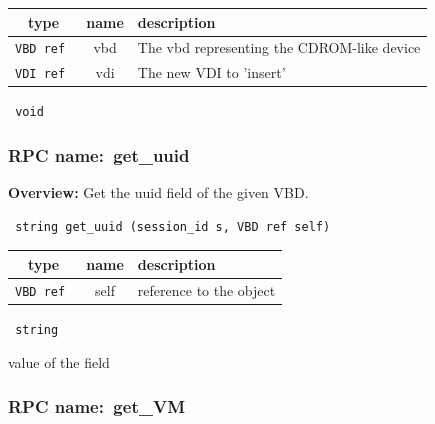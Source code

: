 
 
\vspace{0.3cm}
\begin{tabular}{|c|c|p{7cm}|}
 \hline
{\bf type} & {\bf name} & {\bf description} \\ \hline
{\tt VBD ref } & vbd & The vbd representing the CDROM-like device \\ \hline 

{\tt VDI ref } & vdi & The new VDI to 'insert' \\ \hline 

\end{tabular}

\vspace{0.3cm}

{\tt 
void
}



\vspace{0.3cm}
\vspace{0.3cm}
\vspace{0.3cm}
\subsubsection{RPC name:~get\_uuid}

{\bf Overview:} 
Get the uuid field of the given VBD.

\begin{verbatim} string get_uuid (session_id s, VBD ref self)\end{verbatim}



 
\vspace{0.3cm}
\begin{tabular}{|c|c|p{7cm}|}
 \hline
{\bf type} & {\bf name} & {\bf description} \\ \hline
{\tt VBD ref } & self & reference to the object \\ \hline 

\end{tabular}

\vspace{0.3cm}

{\tt 
string
}


value of the field
\vspace{0.3cm}
\vspace{0.3cm}
\vspace{0.3cm}
\subsubsection{RPC name:~get\_VM}


